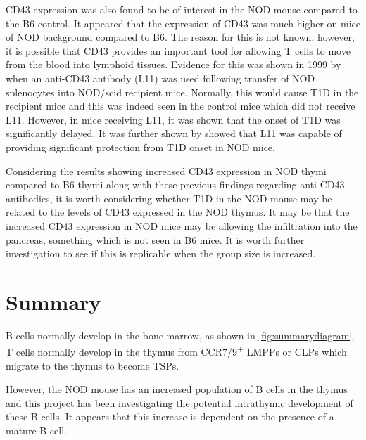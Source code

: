 CD43 expression was also found to be of interest in the NOD mouse compared to the B6 control.
It appeared that the expression of CD43 was much higher on mice of NOD background compared to B6.
The reason for this is not known, however, it is possible that CD43 provides an important tool for allowing T cells to move from the blood into lymphoid tissues.
Evidence for this was shown in 1999 by \citet{Mikulowska1999} when an anti-CD43 antibody (L11) was used following transfer of NOD splenocytes into NOD/scid recipient mice. 
Normally, this would cause T1D in the recipient mice and this was indeed seen in the control mice which did not receive L11.
However, in mice receiving L11, it was shown that the onset of T1D was significantly delayed.
It was further shown by \citet{Johnson1999} showed that L11 was capable of providing significant protection from T1D onset in NOD mice.

Considering the results showing increased CD43 expression in NOD thymi compared to B6 thymi along with these previous findings regarding anti-CD43 antibodies, it is worth considering whether T1D in the NOD mouse may be related to the levels of CD43 expressed in the NOD thymus.
It may be that the increased CD43 expression in NOD mice may be allowing the infiltration into the pancreas, something which is not seen in B6 mice.
It is worth further investigation to see if this is replicable when the group size is increased.



\section{Summary}

B cells normally develop in the bone marrow, as shown in \cref{fig:summarydiagram}.
T cells normally develop in the thymus from CCR7/9\textsuperscript{+} LMPPs or CLPs which migrate to the thymus to become TSPs.

However, the NOD mouse has an increased population of B cells in the thymus and this project has been investigating the potential intrathymic development of these B cells.
It appears that this increase is dependent on the presence of a mature B cell.

